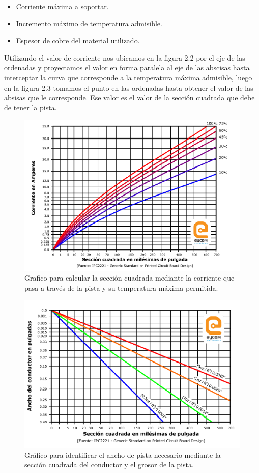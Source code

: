 \begin{itemize} 
\item Corriente máxima a soportar.
\item Incremento máximo de temperatura admisible.
\item Espesor de cobre del material utilizado.
\end{itemize}
Utilizando el valor de corriente nos ubicamos en la figura 2.2 por el eje de las ordenadas y proyectamos el valor en forma paralela al eje de las abscisas hasta interceptar la curva que corresponde a la temperatura máxima admisible, luego en la figura 2.3 tomamos el punto en las ordenadas hasta obtener el valor de las absisas que le corresponde. Ese valor es el valor de la sección cuadrada que debe de tener la pista.

\begin{figure}[H]
\centering
\includegraphics[width=12cm]{capitulo2/figs/figura1.png}
\caption{Grafico para calcular la sección cuadrada mediante la corriente que pasa a través de la pista y su temperatura máxima permitida.}
\end{figure}

\begin{figure}[H]
\centering
\includegraphics[width=12cm]{capitulo2/figs/figura2.png}
\caption{Gráfico para identificar el ancho de pista necesario mediante la sección cuadrada del conductor y el grosor de la pista.}
\end{figure}

